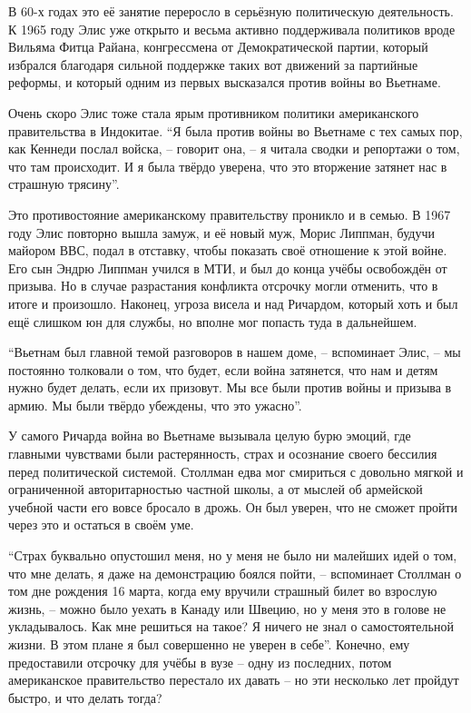 В 60-х годах это её занятие переросло в серьёзную политическую деятельность. К 1965 году Элис уже открыто и весьма активно поддерживала политиков вроде Вильяма Фитца Райана, конгрессмена от Демократической партии, который избрался благодаря сильной поддержке таких вот движений за партийные реформы, и который одним из первых высказался против войны во Вьетнаме.

Очень скоро Элис тоже стала ярым противником политики американского правительства в Индокитае. \enquote{Я была против войны во Вьетнаме с тех самых пор, как Кеннеди послал войска, -- говорит она, -- я читала сводки и репортажи о том, что там происходит. И я была твёрдо уверена, что это вторжение затянет нас в страшную трясину}.

Это противостояние американскому правительству проникло и в семью. В 1967 году Элис повторно вышла замуж, и её новый муж, Морис Липпман, будучи майором ВВС, подал в отставку, чтобы показать своё отношение к этой войне. Его сын Эндрю Липпман учился в МТИ, и был до конца учёбы освобождён от призыва. Но в случае разрастания конфликта отсрочку могли отменить, что в итоге и произошло. Наконец, угроза висела и над Ричардом, который хоть и был ещё слишком юн для службы, но вполне мог попасть туда в дальнейшем.

\enquote{Вьетнам был главной темой разговоров в нашем доме, -- вспоминает Элис, -- мы постоянно толковали о том, что будет, если война затянется, что нам и детям нужно будет делать, если их призовут. Мы все были против войны и призыва в армию. Мы были твёрдо убеждены, что это ужасно}.

У самого Ричарда война во Вьетнаме вызывала целую бурю эмоций, где главными чувствами были растерянность, страх и осознание своего бессилия перед политической системой. Столлман едва мог смириться с довольно мягкой и ограниченной авторитарностью частной школы, а от мыслей об армейской учебной части его вовсе бросало в дрожь. Он был уверен, что не сможет пройти через это и остаться в своём уме.

\enquote{Страх буквально опустошил меня, но у меня не было ни малейших идей о том, что мне делать, я даже на демонстрацию боялся пойти, -- вспоминает Столлман о том дне рождения 16 марта, когда ему вручили страшный билет во взрослую жизнь, -- можно было уехать в Канаду или Швецию, но у меня это в голове не укладывалось. Как мне решиться на такое? Я ничего не знал о самостоятельной жизни. В этом плане я был совершенно не уверен в себе}. Конечно, ему предоставили отсрочку для учёбы в вузе -- одну из последних, потом американское правительство перестало их давать -- но эти несколько лет пройдут быстро, и что делать тогда?


